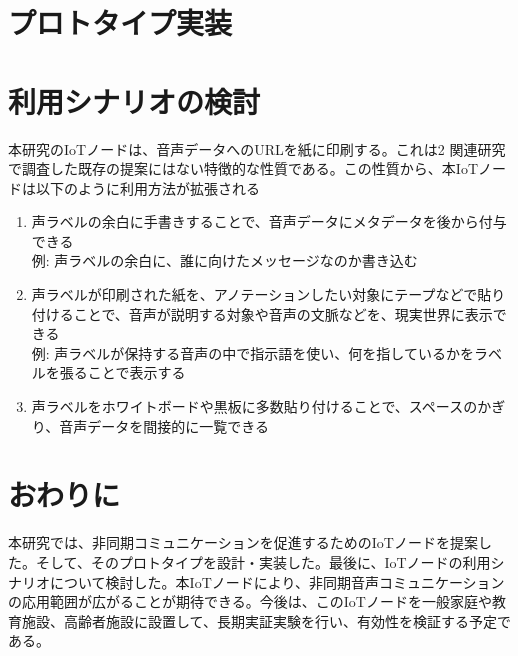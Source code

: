 \documentclass[submit,techrep,noauthor]{ipsj}
\def\|{\verb|}
\begin{document}
% \begin{itemize}
%  \item[$\Box$] 投稿前にチェックリストの各項目を満たしているか，必ず確認
% 	       する． 
% \end{itemize}

%6
\section{プロトタイプ実装}

% 本稿では，A4縦型2段組み用に変更したスタイルファイルを用いた論文のフォー
% マット方法と，論文誌ジャーナル編集委員会がまとめた「べからず集」に基づく
% 論文の書き方を示した．内容的にまだ不十分の部分が多いため，意見，要望等を
% \begin{quote}
%  \|editt@ipsj.or.jp|




\section{利用シナリオの検討}
本研究のIoTノードは、音声データへのURLを紙に印刷する。これは2 関連研究で調査した既存の提案にはない特徴的な性質である。この性質から、本IoTノードは以下のように利用方法が拡張される
\begin{enumerate}
    \item 声ラベルの余白に手書きすることで、音声データにメタデータを後から付与できる\\例: 声ラベルの余白に、誰に向けたメッセージなのか書き込む
    \item 声ラベルが印刷された紙を、アノテーションしたい対象にテープなどで貼り付けることで、音声が説明する対象や音声の文脈などを、現実世界に表示できる \\例: 声ラベルが保持する音声の中で指示語を使い、何を指しているかをラベルを張ることで表示する
    \item 声ラベルをホワイトボードや黒板に多数貼り付けることで、スペースのかぎり、音声データを間接的に一覧できる
\end{enumerate}

\section{おわりに}
本研究では、非同期コミュニケーションを促進するためのIoTノードを提案した。そして、そのプロトタイプを設計・実装した。最後に、IoTノードの利用シナリオについて検討した。本IoTノードにより、非同期音声コミュニケーションの応用範囲が広がることが期待できる。今後は、このIoTノードを一般家庭や教育施設、高齢者施設に設置して、長期実証実験を行い、有効性を検証する予定である。


 
\end{document}
